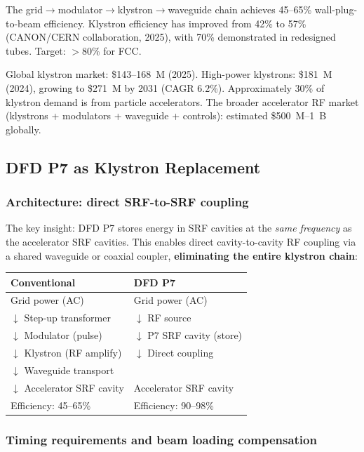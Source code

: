 \documentclass[11pt]{article}
\begin{document}
The grid$\to$modulator$\to$klystron$\to$waveguide chain achieves 45--65\%
wall-plug-to-beam efficiency. Klystron efficiency has improved from 42\%
to 57\% (CANON/CERN collaboration, 2025), with 70\% demonstrated in
redesigned tubes. Target: $>$80\% for FCC.

Global klystron market: \$143--168~M (2025). High-power klystrons:
\$181~M (2024), growing to \$271~M by 2031 (CAGR 6.2\%).
Approximately 30\% of klystron demand is from particle accelerators.
The broader accelerator RF market (klystrons + modulators + waveguide +
controls): estimated \$500~M--1~B globally.

\subsection{DFD P7 as Klystron Replacement}

\subsubsection{Architecture: direct SRF-to-SRF coupling}

The key insight: DFD P7 stores energy in SRF cavities at the
\emph{same frequency} as the accelerator SRF cavities. This enables
direct cavity-to-cavity RF coupling via a shared waveguide or
coaxial coupler, \textbf{eliminating the entire klystron chain}:

\begin{center}
\begin{tabular}{p{5cm}p{5cm}}
\toprule
\textbf{Conventional} & \textbf{DFD P7} \\
\midrule
Grid power (AC) & Grid power (AC) \\
$\downarrow$ Step-up transformer & $\downarrow$ RF source \\
$\downarrow$ Modulator (pulse) & $\downarrow$ P7 SRF cavity (store) \\
$\downarrow$ Klystron (RF amplify) & $\downarrow$ Direct coupling \\
$\downarrow$ Waveguide transport & \\
$\downarrow$ Accelerator SRF cavity & Accelerator SRF cavity \\
\midrule
Efficiency: 45--65\% & Efficiency: 90--98\% \\
\bottomrule
\end{tabular}
\end{center}

\subsubsection{Timing requirements and beam loading compensation}
\end{document}
